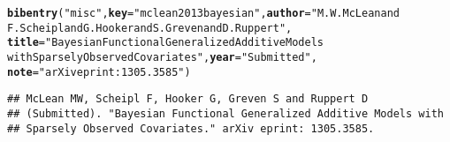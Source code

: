 \documentclass[article]{jss}\usepackage[]{graphicx}\usepackage[]{color}
\makeatletter
\newcommand{\hlstr}[1]{\textcolor[rgb]{0.125,0.125,1}{#1}}%
\newcommand{\hlstd}[1]{\textcolor[rgb]{0.251,0.251,0.282}{#1}}%
\newcommand{\hlkwc}[1]{\textcolor[rgb]{0.529,0,0.184}{\textbf{#1}}}%
\newcommand{\hlkwd}[1]{\textcolor[rgb]{0.251,0.251,0.282}{\textbf{#1}}}%
\newenvironment{kframe}{%
 \def\at@end@of@kframe{}%
 \ifinner\ifhmode%
  \def\at@end@of@kframe{\end{minipage}}%
  \begin{minipage}{\columnwidth}%
 \fi\fi%
 \def\FrameCommand##1{\hskip\@totalleftmargin \hskip-\fboxsep
 \colorbox{shadecolor}{##1}\hskip-\fboxsep
     \hskip-\linewidth \hskip-\@totalleftmargin \hskip\columnwidth}%
 \MakeFramed {\advance\hsize-\width
   \@totalleftmargin\z@ \linewidth\hsize
   \@setminipage}}%
 {\par\unskip\endMakeFramed%
 \at@end@of@kframe}
\newenvironment{knitrout}{}{} %
\makeatother
\begin{document}
\begin{knitrout}
\color{fgcolor}\begin{kframe}
\begin{alltt}
\hlkwd{bibentry}\hlstd{(}\hlstr{"misc"}\hlstd{,} \hlkwc{key} \hlstd{=} \hlstr{"mclean2013bayesian"}\hlstd{,} \hlkwc{author} \hlstd{=} \hlstr{"M. W. McLean and 
         F. Scheipl and G. Hooker and S. Greven and D. Ruppert"}\hlstd{,}
         \hlkwc{title} \hlstd{=} \hlstr{"Bayesian Functional Generalized Additive Models 
                 with Sparsely Observed Covariates"}\hlstd{,} \hlkwc{year} \hlstd{=} \hlstr{"Submitted"}\hlstd{,}
         \hlkwc{note} \hlstd{=} \hlstr{"arXiv eprint: 1305.3585"}\hlstd{)}
\end{alltt}
\begin{verbatim}
## McLean MW, Scheipl F, Hooker G, Greven S and Ruppert D
## (Submitted). "Bayesian Functional Generalized Additive Models with
## Sparsely Observed Covariates." arXiv eprint: 1305.3585.
\end{verbatim}
\end{kframe}
\end{knitrout}
\end{document}
